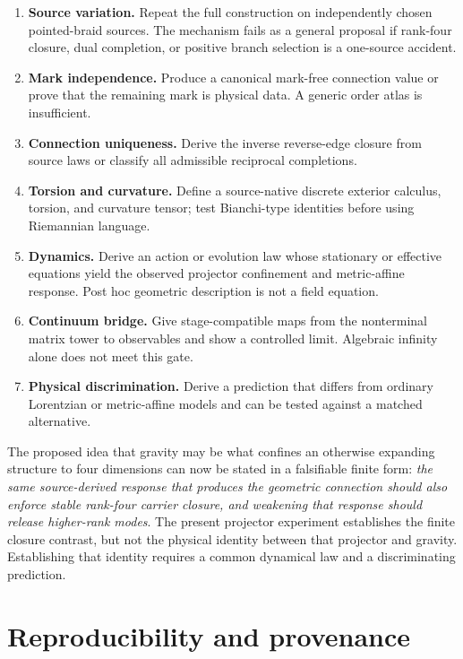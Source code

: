 \documentclass[12pt,a4paper,twoside]{article}
\begin{document}
\begin{enumerate}
  \item \textbf{Source variation.} Repeat the full construction on independently chosen pointed-braid sources. The mechanism fails as a general proposal if rank-four closure, dual completion, or positive branch selection is a one-source accident.
  \item \textbf{Mark independence.} Produce a canonical mark-free connection value or prove that the remaining mark is physical data. A generic order atlas is insufficient.
  \item \textbf{Connection uniqueness.} Derive the inverse reverse-edge closure from source laws or classify all admissible reciprocal completions.
  \item \textbf{Torsion and curvature.} Define a source-native discrete exterior calculus, torsion, and curvature tensor; test Bianchi-type identities before using Riemannian language.
  \item \textbf{Dynamics.} Derive an action or evolution law whose stationary or effective equations yield the observed projector confinement and metric-affine response. Post hoc geometric description is not a field equation.
  \item \textbf{Continuum bridge.} Give stage-compatible maps from the nonterminal matrix tower to observables and show a controlled limit. Algebraic infinity alone does not meet this gate.
  \item \textbf{Physical discrimination.} Derive a prediction that differs from ordinary Lorentzian or metric-affine models and can be tested against a matched alternative.
\end{enumerate}

The proposed idea that gravity may be what confines an otherwise expanding structure to four dimensions can now be stated in a falsifiable finite form: \emph{the same source-derived response that produces the geometric connection should also enforce stable rank-four carrier closure, and weakening that response should release higher-rank modes}. The present projector experiment establishes the finite closure contrast, but not the physical identity between that projector and gravity. Establishing that identity requires a common dynamical law and a discriminating prediction.

\section{Reproducibility and provenance}
\end{document}
